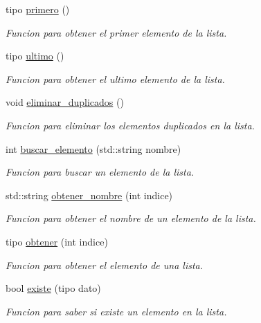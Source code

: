 \begin{DoxyCompactItemize}
tipo \hyperlink{classLista_a7bfb23a36d8476b8731d955bd52b81d5}{primero} ()
\begin{DoxyCompactList}\small\item\em Funcion para obtener el primer elemento de la lista. \end{DoxyCompactList}\item 
tipo \hyperlink{classLista_ab425ba6e39a83df96a56ef6d58bce951}{ultimo} ()
\begin{DoxyCompactList}\small\item\em Funcion para obtener el ultimo elemento de la lista. \end{DoxyCompactList}\item 
\mbox{\label{classLista_a984961f2492bbd50fc373c2726a26e82}} 
void \hyperlink{classLista_a984961f2492bbd50fc373c2726a26e82}{eliminar\+\_\+duplicados} ()
\begin{DoxyCompactList}\small\item\em Funcion para eliminar los elementos duplicados en la lista. \end{DoxyCompactList}\item 
int \hyperlink{classLista_a18cad7f9b4ae2e76a3083e8e25246588}{buscar\+\_\+elemento} (std\+::string nombre)
\begin{DoxyCompactList}\small\item\em Funcion para buscar un elemento de la lista. \end{DoxyCompactList}\item 
std\+::string \hyperlink{classLista_ac1b4a38c8aee5835dcbb3185972c1b11}{obtener\+\_\+nombre} (int indice)
\begin{DoxyCompactList}\small\item\em Funcion para obtener el nombre de un elemento de la lista. \end{DoxyCompactList}\item 
tipo \hyperlink{classLista_a8ae71c3b813589c892ab1f4ff8edd753}{obtener} (int indice)
\begin{DoxyCompactList}\small\item\em Funcion para obtener el elemento de una lista. \end{DoxyCompactList}\item 
bool \hyperlink{classLista_a63f1a416d1bc0eb65b708f99cff25677}{existe} (tipo dato)
\begin{DoxyCompactList}\small\item\em Funcion para saber si existe un elemento en la lista. \end{DoxyCompactList}\item 

\end{DoxyCompactItemize}
